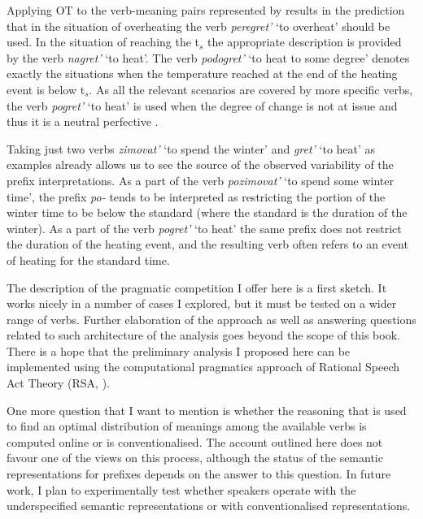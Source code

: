 Applying OT to the verb-meaning pairs represented by  results in the prediction that in the situation of overheating the verb \textit{peregret'} `to overheat' should be used. In the situation of reaching the t$_s$ the appropriate description is provided by the verb \textit{nagret'} `to heat'. The verb \textit{podogret'} `to heat to some degree' denotes exactly the situations when the temperature reached at the end of the heating event is below t$_s$. As all the relevant scenarios are covered by more specific verbs, the verb \textit{pogret'} `to heat' is used when the degree of change is not at issue and thus it is a neutral perfective  .

Taking just two verbs \textit{zimovat'} `to spend the winter' and \textit{gret'} `to heat' as examples already allows us to see the source of the observed variability of the prefix interpretations. As a part of the verb \textit{pozimovat'} `to spend some winter time', the prefix \textit{po-}   tends to be interpreted as restricting the portion of the winter time to be below the standard (where the standard is the duration of the winter). As a part of the verb \textit{pogret'} `to heat' the same prefix does not restrict the duration of the heating event, and the resulting verb often refers to an event of heating for the standard time. 

The description of the pragmatic competition I offer here is a first sketch. It works nicely in a number of cases I explored, but it must be tested on a wider range of verbs. Further elaboration of the approach as well as answering questions related to such architecture of the analysis goes beyond the scope of this book. There is a hope that the preliminary analysis I proposed here can be implemented using the computational pragmatics approach of Rational Speech Act Theory (RSA, \citealt{Franke:09, FrankGoodman:12, GoodmanStuhlmuller:13, FrankeJager:15, GoodmanFrank:16}). 

One more question that I want to mention is whether the reasoning that is used to find an optimal distribution of meanings among the available verbs is computed online or is conventionalised. The account outlined here does not favour one of the views on this process, although the status of the semantic representations for prefixes depends on the answer to this question. In future  work, I plan to experimentally test whether speakers operate with the underspecified semantic representations or with conventionalised representations. 

